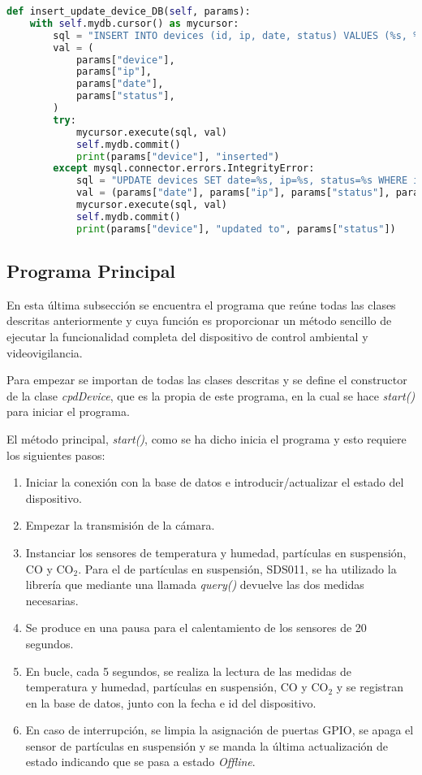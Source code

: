 \begin{lstlisting}[language=Python, label=cod:estadoDB, caption=Inserción de estado del dispositivo en la base de datos]
def insert_update_device_DB(self, params):
    with self.mydb.cursor() as mycursor:
        sql = "INSERT INTO devices (id, ip, date, status) VALUES (%s, %s, %s, %s)"
        val = (
            params["device"],
            params["ip"],
            params["date"],
            params["status"],
        )
        try:
            mycursor.execute(sql, val)
            self.mydb.commit()
            print(params["device"], "inserted")
        except mysql.connector.errors.IntegrityError:
            sql = "UPDATE devices SET date=%s, ip=%s, status=%s WHERE id=%s"
            val = (params["date"], params["ip"], params["status"], params["device"])
            mycursor.execute(sql, val)
            self.mydb.commit()
            print(params["device"], "updated to", params["status"])
\end{lstlisting}

\subsection{Programa Principal}
En esta última subsección se encuentra el programa que reúne todas las clases descritas anteriormente y cuya función es proporcionar un método sencillo de ejecutar la funcionalidad completa del dispositivo de control ambiental y videovigilancia.

Para empezar se importan de todas las clases descritas y se define el constructor de la clase \textit{cpdDevice}, que es la propia de este programa, en la cual se hace \textit{start()} para iniciar el programa.

El método principal, \textit{start()}, como se ha dicho inicia el programa y esto requiere los siguientes pasos:
\begin{enumerate}
    \item Iniciar la conexión con la base de datos e introducir/actualizar el estado del dispositivo.
    \item Empezar la transmisión de la cámara.
    \item Instanciar los sensores de temperatura y humedad, partículas en suspensión, CO y CO$_2$. Para el de partículas en suspensión, SDS011, se ha utilizado la librería \cite{rovai_python4ds_2021} que mediante una llamada \textit{query()} devuelve las dos medidas necesarias.
    \item Se produce en una pausa para el calentamiento de los sensores de 20 segundos.
    \item En bucle, cada 5 segundos, se realiza la lectura de las medidas de temperatura y humedad, partículas en suspensión, CO y CO$_2$ y se registran en la base de datos, junto con la fecha e id del dispositivo.
    \item En caso de interrupción, se limpia la asignación de puertas GPIO, se apaga el sensor de partículas en suspensión y se manda la última actualización de estado indicando que se pasa a estado \textit{Offline}.
\end{enumerate}

